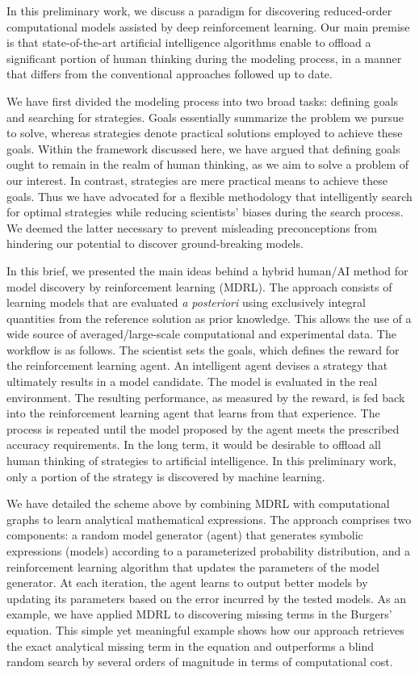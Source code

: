 \documentclass{article}
\begin{document}
In this preliminary work, we discuss a paradigm for discovering reduced-order computational models assisted by
deep reinforcement learning. Our main premise is that state-of-the-art artificial intelligence algorithms enable to offload a significant portion of human thinking during the modeling process, in a manner that differs from the conventional approaches followed up to date.

We have first divided the modeling process into two broad tasks: defining goals and searching for strategies. Goals essentially summarize the problem we pursue to solve, whereas strategies denote practical solutions employed to achieve these goals.
Within the framework discussed here, we have argued that defining goals ought to remain in the realm of human thinking, as we aim to solve a problem of our interest. In contrast, strategies are mere practical means to achieve these goals. Thus we have advocated for a flexible methodology that intelligently search for optimal strategies while reducing scientists' biases during the search process. We deemed the latter necessary to prevent misleading preconceptions from hindering our potential to discover ground-breaking models.


In this brief, we presented the main ideas behind a hybrid human/AI method for model discovery by reinforcement learning (MDRL). The approach consists of learning models that are evaluated \emph{a posteriori} using exclusively integral quantities from the reference solution as prior knowledge. This allows the use of a wide source of averaged/large-scale computational and experimental data. The workflow is as follows. The scientist sets the goals, which defines the reward for the reinforcement learning agent. An intelligent agent devises a strategy that ultimately results in a model candidate. The model is evaluated in the real environment. The resulting performance, as measured by the reward, is fed back into the reinforcement learning agent that learns from that experience. The process is repeated until the model proposed by the agent meets the prescribed accuracy requirements. In the long term, it would be desirable to offload all human thinking of strategies to artificial intelligence. In this preliminary work, only a portion of the strategy is discovered by
machine learning.

We have detailed the scheme above by combining MDRL with computational graphs to learn analytical mathematical expressions. The approach comprises two components: a random model generator (agent) that generates symbolic expressions (models) according to a parameterized probability distribution, and a reinforcement learning algorithm that updates the parameters of the model generator. At each iteration, the agent learns to output better models by updating its parameters based on the error incurred by the tested models. As an example, we have applied MDRL to discovering missing terms in the Burgers' equation. This simple yet meaningful example shows how our approach retrieves the exact analytical missing term in the equation and outperforms a blind random search by several orders of magnitude in terms of computational cost.
\end{document}
